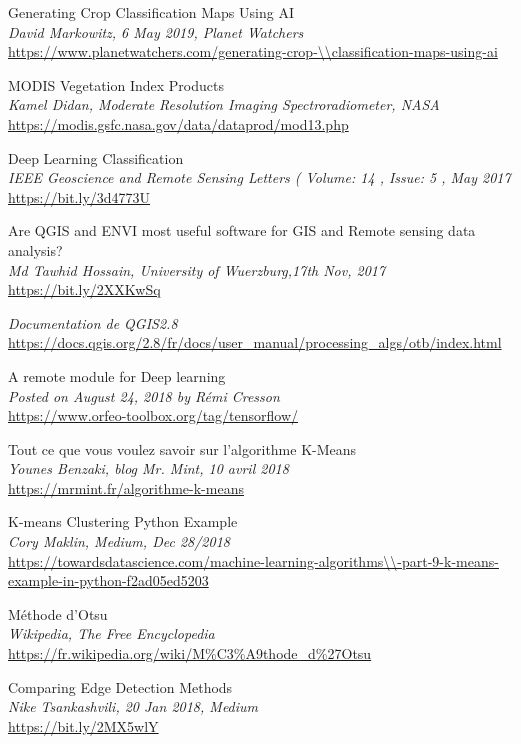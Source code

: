 \documentclass[12pt, openany]{report}
\begin{document}
\begin{thebibliography}{9}
Generating Crop Classification Maps Using AI\\
\textit{David Markowitz, 6 May 2019, Planet Watchers}\\
\url{https://www.planetwatchers.com/generating-crop-\\classification-maps-using-ai}

MODIS Vegetation Index Products\\
\textit{Kamel Didan, Moderate Resolution Imaging Spectroradiometer, NASA}\\
\url{https://modis.gsfc.nasa.gov/data/dataprod/mod13.php}

Deep Learning Classification\\
\textit{ IEEE Geoscience and Remote Sensing Letters ( Volume: 14 , Issue: 5 , May 2017 }\\
\url{https://bit.ly/3d4773U}

Are QGIS and ENVI most useful software for GIS and Remote sensing data analysis?\\
\textit{Md Tawhid Hossain, University of Wuerzburg,17th Nov, 2017}\\
\url{https://bit.ly/2XXKwSq}

\textit{Documentation de QGIS2.8}\\
\url{https://docs.qgis.org/2.8/fr/docs/user_manual/processing_algs/otb/index.html}

A remote module for Deep learning\\
\textit{Posted on August 24, 2018 by Rémi Cresson}\\
\url{https://www.orfeo-toolbox.org/tag/tensorflow/}

Tout ce que vous voulez savoir sur l’algorithme K-Means\\
\textit{Younes Benzaki, blog Mr. Mint,  10 avril 2018}\\
\url{https://mrmint.fr/algorithme-k-means}


K-means Clustering Python Example\\
\textit{Cory Maklin, Medium, Dec 28/2018}\\
\url{https://towardsdatascience.com/machine-learning-algorithms\\-part-9-k-means-example-in-python-f2ad05ed5203}

Méthode d'Otsu\\
\textit{{W}ikipedia{,} The Free Encyclopedia}\\
\url{https://fr.wikipedia.org/wiki/M\%C3\%A9thode_d\%27Otsu}

Comparing Edge Detection Methods\\
\textit{Nike Tsankashvili, 20 Jan 2018, Medium}\\
\url{https://bit.ly/2MX5wlY}




\end{thebibliography}
\end{document}
